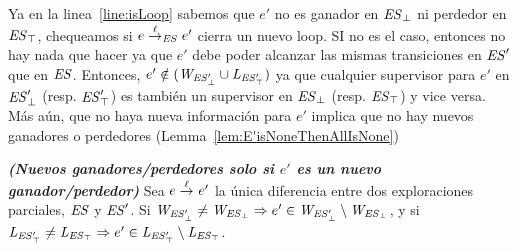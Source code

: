 Ya en la linea~\ref{line:isLoop} sabemos que $e'$ no es ganador en $\mathit{\mathit{ES}_{\bot}}$ ni perdedor en $\mathit{\mathit{ES}_{\top}}$, chequeamos si $e 
\overset{\ell}{\rightarrow}_{\mathit{ES}} e'$ cierra un nuevo loop. SI no es el caso, entonces no hay nada que hacer ya que $e'$ debe poder alcanzar las mismas transiciones en $\mathit{ES}'$ que en $\mathit{ES}$. Entonces, $e' \notin 
(\mathit{W_{\mathit{\mathit{ES}'_{\bot}}}} \cup \mathit{L_{\mathit{\mathit{ES}'_{\top}}}})$ ya que cualquier supervisor para $e'$ en $\mathit{\mathit{ES}'_{\bot}}$ (resp. $\mathit{\mathit{ES}'_{\top}}$) es también un supervisor en $\mathit{\mathit{ES}_{\bot}}$ (resp. 
$\mathit{\mathit{ES}_{\top}}$) y vice versa.  
%
%
Más aún, que no haya nueva información para $e'$ implica que no hay nuevos ganadores o perdedores (Lemma~\ref{lem:E'isNoneThenAllIsNone})

\begin{lemma}\textbf{\emph{(Nuevos ganadores/perdedores solo si $e'$ es un nuevo ganador/perdedor)}}
\label{lem:E'isNoneThenAllIsNone}
Sea $e \overset{\ell}{\rightarrow}_{} e'$ la única diferencia entre dos exploraciones parciales, $\mathit{ES}$ y $\mathit{ES}'$. Si $\mathit{W_{\mathit{\mathit{ES}'_{\bot}}}} \neq \mathit{W_{\mathit{\mathit{ES}_{\bot}}}} \Rightarrow e' \in \mathit{W_{\mathit{\mathit{ES}'_{\bot}}}} \setminus \mathit{W_{\mathit{\mathit{ES}_{\bot}}}}$, y si $\mathit{L_{\mathit{\mathit{ES}'_{\top}}}} \neq \mathit{L_{\mathit{\mathit{ES}_{\top}}}} \Rightarrow e' \in \mathit{L_{\mathit{\mathit{ES}'_{\top}}}} \setminus \mathit{L_{\mathit{\mathit{ES}_{\top}}}}$.
\end{lemma}

